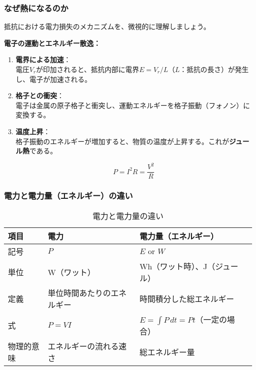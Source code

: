 \subsubsection{なぜ熱になるのか}

抵抗における電力損失のメカニズムを、微視的に理解しましょう。

\begin{screen}
\textbf{電子の運動とエネルギー散逸：}

\begin{enumerate}
\item \textbf{電界による加速}：\\
電圧$V_r$が印加されると、抵抗内部に電界$E = V_r/L$（$L$：抵抗の長さ）が発生し、電子が加速される。

\item \textbf{格子との衝突}：\\
電子は金属の原子格子と衝突し、運動エネルギーを格子振動（フォノン）に変換する。

\item \textbf{温度上昇}：\\
格子振動のエネルギーが増加すると、物質の温度が上昇する。これが\textbf{ジュール熱}である。

\begin{equation}
P = I^2 R = \frac{V^2}{R}
\end{equation}
\end{enumerate}
\end{screen}

\subsubsection{電力と電力量（エネルギー）の違い}

\begin{table}[H]
\centering
\caption{電力と電力量の違い}
\begin{tabular}{|l|l|l|l|}
\hline
\textbf{項目} & \textbf{電力} & \textbf{電力量（エネルギー）} \\
\hline
\hline
記号 & $P$ & $E$ or $W$ \\
\hline
単位 & W（ワット） & Wh（ワット時）、J（ジュール） \\
\hline
定義 & 単位時間あたりのエネルギー & 時間積分した総エネルギー \\
\hline
式 & $P = VI$ & $E = \int P \, dt = Pt$（一定の場合） \\
\hline
物理的意味 & エネルギーの流れる速さ & 総エネルギー量 \\
\hline
\end{tabular}
\end{table}

